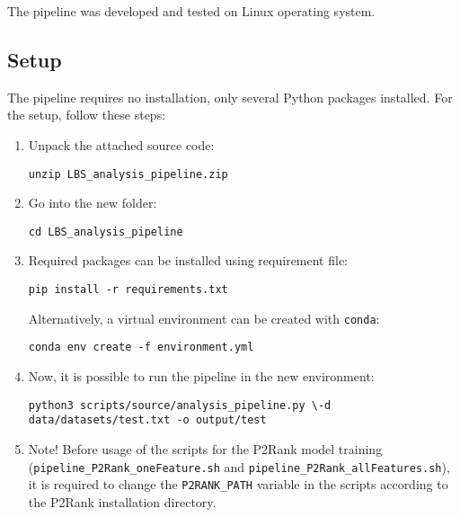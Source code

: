 \documentclass[12pt,a4paper]{report}
\begin{document}
The pipeline was developed and tested on Linux operating system.

\subsection{Setup}
The pipeline requires no installation, only several Python packages installed. For the setup, follow these steps:
\begin{enumerate}
\item Unpack the attached source code:

\texttt{unzip LBS\_analysis\_pipeline.zip}

\item Go into the new folder:

\texttt{cd LBS\_analysis\_pipeline}

\item Required packages can be installed using requirement file:

\texttt{pip install -r requirements.txt}

Alternatively, a virtual environment can be created with \texttt{conda}:

\texttt{conda env create -f environment.yml}

\item Now, it is possible to run the pipeline in the new environment:

\texttt{python3 scripts/source/analysis\_pipeline.py \textbackslash \newline -d data/datasets/test.txt -o output/test}

\item Note! Before usage of the scripts for the P2Rank model training \newline (\texttt{pipeline\_P2Rank\_oneFeature.sh} and \texttt{pipeline\_P2Rank\_allFeatures.sh}), it is required to change the \texttt{P2RANK\_PATH} variable in the scripts according to the P2Rank installation directory.

\end{enumerate}
\end{document}
